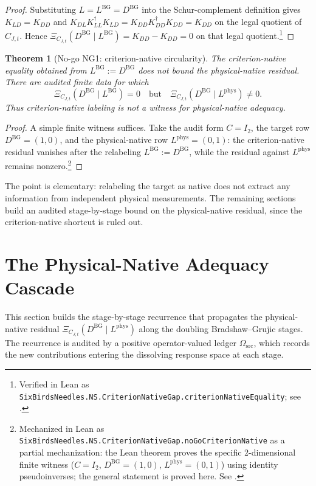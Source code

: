\documentclass[11pt]{article}
\newcommand{\DBG}{D^{\mathrm{BG}}}
\newcommand{\LBG}{L^{\mathrm{BG}}}
\newcommand{\Lphys}{L^{\mathrm{phys}}}
\newcommand{\Omsrc}{\Omega_{\mathrm{src}}}
\newtheorem{theorem}{Theorem}[section]
\theoremstyle{definition}
\begin{document}
\begin{proof}
Substituting \(L=\LBG=\DBG\) into the Schur-complement definition gives
\(K_{LD}=K_{DD}\) and
\(K_{DL}K_{LL}^{\dagger}K_{LD}=K_{DD}K_{DD}^{\dagger}K_{DD}=K_{DD}\)
on the legal quotient of \(C_{J,t}\).  Hence
\(\Xi_{C_{J,t}}(\DBG\mid\LBG)=K_{DD}-K_{DD}=0\) on that legal
quotient.\footnote{Verified in Lean as \texttt{SixBirdsNeedles.NS.CriterionNativeGap.criterionNativeEquality}; see .}
\end{proof}

\begin{theorem}[No-go NG1: criterion-native circularity]\label{thm:ns:no-go-criterion-native}
The criterion-native equality obtained from \(\LBG:=\DBG\) does not
bound the physical-native residual.  There are audited finite data for
which
\[
  \Xi_{C_{J,t}}(\DBG\mid\LBG)=0
  \quad\text{but}\quad
  \Xi_{C_{J,t}}(\DBG\mid\Lphys)\ne 0 .
\]
Thus criterion-native labeling is not a witness for physical-native
adequacy.
\end{theorem}

\begin{proof}
A simple finite witness suffices.  Take the audit form \(C=I_2\), the
target row \(\DBG=(1,0)\), and the physical-native row
\(\Lphys=(0,1)\): the criterion-native residual vanishes after the
relabeling \(\LBG:=\DBG\), while the residual against \(\Lphys\)
remains nonzero.\footnote{Mechanized in Lean as
\texttt{SixBirdsNeedles.NS.CriterionNativeGap.noGoCriterionNative}
as a partial mechanization: the Lean theorem proves the
specific 2-dimensional finite witness
(\(C=I_2\), \(\DBG=(1,0)\), \(\Lphys=(0,1)\)) using identity
pseudoinverses; the general statement is proved here.  See
.}
\end{proof}

The point is elementary: relabeling the target as native does not
extract any information from independent physical measurements.  The
remaining sections build an audited stage-by-stage bound on the
physical-native residual, since the criterion-native shortcut is
ruled out.

 

\section{The Physical-Native Adequacy Cascade}
\label{sec:adequacy-cascade}

This section builds the stage-by-stage recurrence that propagates the
physical-native residual \(\Xi_{C_{J,t}}(\DBG\mid\Lphys)\) along the
doubling Bradshaw--Grujic stages.  The recurrence is audited by a
positive operator-valued ledger \(\Omsrc\), which records the new
contributions entering the dissolving response space at each stage.
\end{document}
